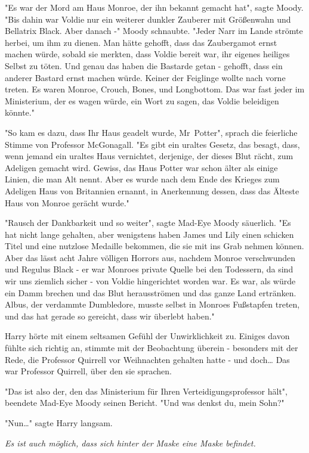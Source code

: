 {"Es war der Mord am Haus Monroe, der ihn bekannt gemacht hat", sagte Moody. "Bis dahin war Voldie nur ein weiterer dunkler Zauberer mit Größenwahn und Bellatrix Black. Aber danach -" Moody schnaubte. "Jeder Narr im Lande strömte herbei, um ihm zu dienen. Man hätte gehofft, dass das Zaubergamot ernst machen würde, sobald sie merkten, dass Voldie bereit war, ihr eigenes heiliges Selbst zu töten. Und genau das haben die Bastarde getan - gehofft, dass ein anderer Bastard ernst machen würde. Keiner der Feiglinge wollte nach vorne treten. Es waren Monroe, Crouch, Bones, und Longbottom. Das war fast jeder im Ministerium, der es wagen würde, ein Wort zu sagen, das Voldie beleidigen könnte."

"So kam es dazu, dass Ihr Haus geadelt wurde, Mr~Potter", sprach die feierliche Stimme von Professor McGonagall. "Es gibt ein uraltes Gesetz, das besagt, dass, wenn jemand ein uraltes Haus vernichtet, derjenige, der dieses Blut rächt, zum Adeligen gemacht wird. Gewiss, das Haus Potter war schon älter als einige Linien, die man Alt nennt. Aber es wurde nach dem Ende des Krieges zum Adeligen Haus von Britannien ernannt, in Anerkennung dessen, dass das Älteste Haus von Monroe gerächt wurde."

"Rausch der Dankbarkeit und so weiter", sagte Mad-Eye Moody säuerlich. "Es hat nicht lange gehalten, aber wenigstens haben James und Lily einen schicken Titel und eine nutzlose Medaille bekommen, die sie mit ins Grab nehmen können. Aber das lässt acht Jahre völligen Horrors aus, nachdem Monroe verschwunden und Regulus Black - er war Monroes private Quelle bei den Todessern, da sind wir uns ziemlich sicher - von Voldie hingerichtet worden war. Es war, als würde ein Damm brechen und das Blut herausströmen und das ganze Land ertränken. Albus, der verdammte Dumbledore, musste selbst in Monroes Fußstapfen treten, und das hat gerade so gereicht, dass wir überlebt haben."

Harry hörte mit einem seltsamen Gefühl der Unwirklichkeit zu. Einiges davon fühlte sich richtig an, stimmte mit der Beobachtung überein - besonders mit der Rede, die Professor Quirrell vor Weihnachten gehalten hatte - und doch… Das war Professor Quirrell, über den sie sprachen.

"Das ist also der, den das Ministerium für Ihren Verteidigungsprofessor hält", beendete Mad-Eye Moody seinen Bericht. "Und was denkst du, mein Sohn?"

"Nun…" sagte Harry langsam.

\emph{Es ist auch möglich, dass sich hinter der Maske eine Maske befindet.}

}
